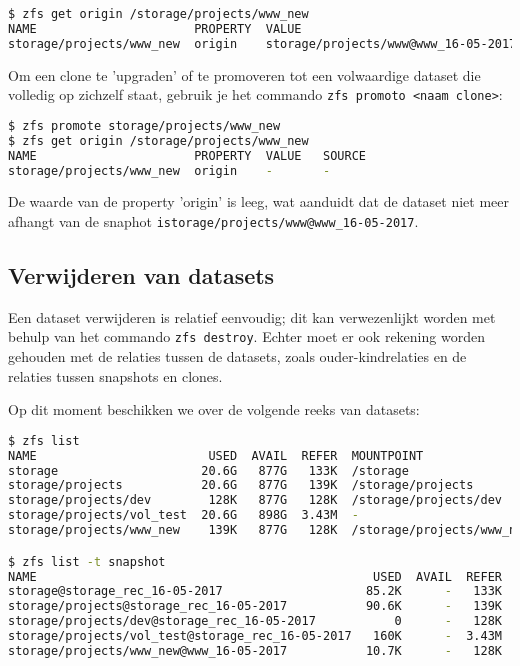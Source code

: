 \begin{lstlisting}[language=bash,style=command_style] 
$ zfs get origin /storage/projects/www_new
NAME                      PROPERTY  VALUE                                SOURCE
storage/projects/www_new  origin    storage/projects/www@www_16-05-2017  -
\end{lstlisting}

Om een clone te 'upgraden' of te promoveren tot een volwaardige dataset die volledig op zichzelf staat, gebruik je het commando \texttt{zfs promoto <naam clone>}:

\begin{lstlisting}[language=bash,style=command_style] 
$ zfs promote storage/projects/www_new
$ zfs get origin /storage/projects/www_new
NAME                      PROPERTY  VALUE   SOURCE
storage/projects/www_new  origin    -       -
\end{lstlisting}

De waarde van de property 'origin' is leeg, wat aanduidt dat de dataset niet meer afhangt van de snaphot \texttt{istorage/projects/www@www\_16-05-2017}. 

\clearpage

\subsection{Verwijderen van datasets}

Een dataset verwijderen is relatief eenvoudig; dit kan verwezenlijkt worden met behulp van het commando \texttt{zfs destroy}. Echter moet er ook rekening worden gehouden met de relaties tussen de datasets, zoals ouder-kindrelaties en de relaties tussen snapshots en clones.

Op dit moment beschikken we over de volgende reeks van datasets:

\begin{lstlisting}[language=bash,style=command_style] 
$ zfs list
NAME                        USED  AVAIL  REFER  MOUNTPOINT
storage                    20.6G   877G   133K  /storage
storage/projects           20.6G   877G   139K  /storage/projects
storage/projects/dev        128K   877G   128K  /storage/projects/dev
storage/projects/vol_test  20.6G   898G  3.43M  -
storage/projects/www_new    139K   877G   128K  /storage/projects/www_new

$ zfs list -t snapshot
NAME                                               USED  AVAIL  REFER  MOUNTPOINT
storage@storage_rec_16-05-2017                    85.2K      -   133K  -
storage/projects@storage_rec_16-05-2017           90.6K      -   139K  -
storage/projects/dev@storage_rec_16-05-2017           0      -   128K  -
storage/projects/vol_test@storage_rec_16-05-2017   160K      -  3.43M  -
storage/projects/www_new@www_16-05-2017           10.7K      -   128K  -
\end{lstlisting}

